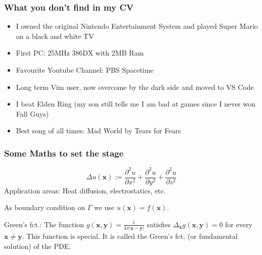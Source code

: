 \documentclass[dvipsnames,10pt]{beamer}
\def\bx{\mathbf{x}}
\def\by{\mathbf{y}}
\begin{document}
\begin{frame}
	\frametitle{What you don't find in my CV}
	
	\begin{itemize}
	\item I owned the original Nintendo Entertainment System and played Super Mario on a black and white TV
	\item First PC: 25MHz 386DX with 2MB Ram
	\item Favourite Youtube Channel: PBS Spacetime
	\item Long term Vim user, now overcome by the dark side and moved to VS Code
	\item  I beat Elden Ring (my son still tells me I am bad at games since I never won Fall Guys)
	\item Best song of all times: Mad World by Tears for Fears
	\end{itemize}
	
\end{frame}

\begin{frame}
	\frametitle{Some Maths to set the stage}
	
    \begin{minipage}{5cm}
\end{minipage}
\begin{minipage}{5cm}
$$
\Delta u(\bx) := \frac{\partial^2 u}{\partial x^2} + \frac{\partial^2 u}{\partial y^2} + \frac{\partial^2 u}{\partial z^2}
$$
Application areas: Heat diffusion, electrostatics, etc.
\end{minipage}

\vspace{.5cm}

As boundary condition on $\Gamma$ we use $u(\bx) = f(\bx)$.

\begin{tcolorbox}
Green's fct.: The function $g(\bx, \by) = \frac{1}{4\pi | \bx - \by|}$ satisfies $\Delta_{\bx}g(\bx, \by) = 0$ for every $\bx\neq \by$. This function is special. It is called the Green's fct. (or fundamental solution) of the PDE.
\end{tcolorbox}

	
\end{frame}
\end{document}
